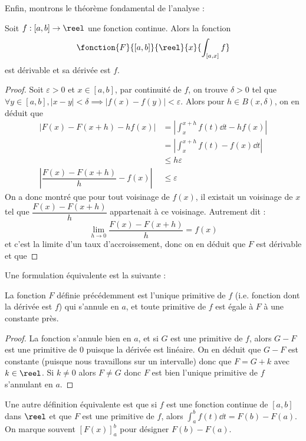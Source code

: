 Enfin, montrons le théorème fondamental de l'analyse :

\begin{them}
    Soit $f : [a,b]\to\reel$ une fonction continue. Alors la fonction $$\fonction{F}{[a,b]}{\reel}{x}{\displaystyle\int_{[a,x]} f}$$ est dérivable et sa dérivée est $f$.
\end{them}

\begin{proof}
    Soit $\varepsilon > 0$ et $x\in [a,b]$, par continuité de $f$, on trouve $\delta > 0$ tel que $\forall y\in[a,b],|x-y|<\delta \implies |f(x)-f(y)|<\varepsilon$. Alors pour $h \in B(x,\delta)$, on en déduit que 
    \begin{align*}
        \left|F(x)-F(x+h)-hf(x)\right| &= \left|\int_x^{x+h} f(t)\dd t - hf(x)\right|\\
        &= \left|\int_x^{x+h} f(t)-f(x)\dd t\right|\\
        &\leq h\varepsilon\\
        \left|\dfrac{F(x)-F(x+h)}{h}-f(x)\right| &\leq \varepsilon
    \end{align*}
    On a donc montré que pour tout voisinage de $f(x)$, il existait un voisinage de $x$ tel que $\dfrac{F(x)-F(x+h)}{h}$ appartenait à ce voisinage. Autrement dit : $$\lim_{h\to 0} \dfrac{F(x)-F(x+h)}{h} = f(x)$$ et c'est la limite d'un taux d'accroissement, donc on en déduit que $F$ est dérivable et que 
\end{proof}

Une formulation équivalente est la suivante :

\begin{cor}
    La fonction $F$ définie précédemment est l'unique primitive de $f$ (i.e. fonction dont la dérivée est $f$) qui s'annule en $a$, et toute primitive de $f$ est égale à $F$ à une constante près.
\end{cor}

\begin{proof}
    La fonction s'annule bien en $a$, et si $G$ est une primitive de $f$, alors $G-F$ est une primitive de $0$ puisque la dérivée est linéaire. On en déduit que $G-F$ est constante (puisque nous travaillons sur un intervalle) donc que $F = G + k$ avec $k\in \reel$. Si $k \neq 0$ alors $F\neq G$ donc $F$ est bien l'unique primitive de $f$ s'annulant en $a$.
\end{proof}

\begin{rmk}
    Une autre définition équivalente est que si $f$ est une fonction continue de $[a,b]$ dans $\reel$ et que $F$ est une primitive de $f$, alors $\displaystyle\int_a^b f(t)\dd t = F(b)-F(a)$. On marque souvent $[F(x)]_a^b$ pour désigner $F(b)-F(a)$.
\end{rmk}

